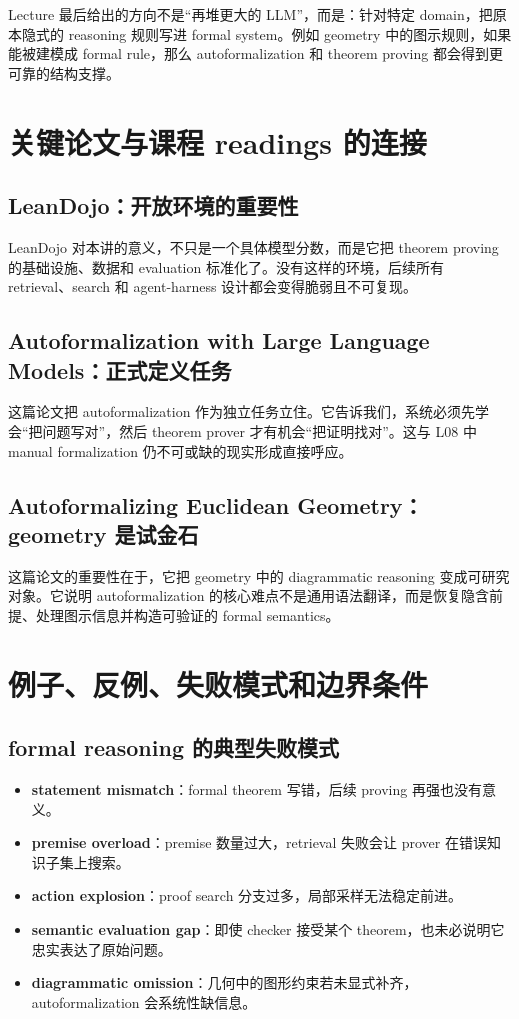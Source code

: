 \documentclass[a4paper]{article}
\begin{document}
Lecture 最后给出的方向不是“再堆更大的 LLM”，而是：针对特定 domain，把原本隐式的 reasoning 规则写进 formal system。例如 geometry 中的图示规则，如果能被建模成 formal rule，那么 autoformalization 和 theorem proving 都会得到更可靠的结构支撑。

\section{关键论文与课程 readings 的连接}

\subsection{LeanDojo：开放环境的重要性}

LeanDojo 对本讲的意义，不只是一个具体模型分数，而是它把 theorem proving 的基础设施、数据和 evaluation 标准化了。没有这样的环境，后续所有 retrieval、search 和 agent-harness 设计都会变得脆弱且不可复现。

\subsection{Autoformalization with Large Language Models：正式定义任务}

这篇论文把 autoformalization 作为独立任务立住。它告诉我们，系统必须先学会“把问题写对”，然后 theorem prover 才有机会“把证明找对”。这与 L08 中 manual formalization 仍不可或缺的现实形成直接呼应。

\subsection{Autoformalizing Euclidean Geometry：geometry 是试金石}

这篇论文的重要性在于，它把 geometry 中的 diagrammatic reasoning 变成可研究对象。它说明 autoformalization 的核心难点不是通用语法翻译，而是恢复隐含前提、处理图示信息并构造可验证的 formal semantics。

\section{例子、反例、失败模式和边界条件}

\subsection{formal reasoning 的典型失败模式}

\begin{itemize}
\item \textbf{statement mismatch}：formal theorem 写错，后续 proving 再强也没有意义。
\item \textbf{premise overload}：premise 数量过大，retrieval 失败会让 prover 在错误知识子集上搜索。
\item \textbf{action explosion}：proof search 分支过多，局部采样无法稳定前进。
\item \textbf{semantic evaluation gap}：即使 checker 接受某个 theorem，也未必说明它忠实表达了原始问题。
\item \textbf{diagrammatic omission}：几何中的图形约束若未显式补齐，autoformalization 会系统性缺信息。
\end{itemize}
\end{document}
